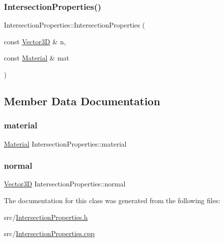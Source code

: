 \subsubsection{\texorpdfstring{IntersectionProperties()}{IntersectionProperties()}\hspace{0.1cm}{\footnotesize\ttfamily [2/2]}}
{\footnotesize\ttfamily Intersection\+Properties\+::\+Intersection\+Properties (\begin{DoxyParamCaption}\item[{const \mbox{\hyperlink{classVector3D}{Vector3D}} \&}]{n,  }\item[{const \mbox{\hyperlink{classMaterial}{Material}} \&}]{mat }\end{DoxyParamCaption})}



\subsection{Member Data Documentation}
\mbox{\label{classIntersectionProperties_a52218ae741a9cd035eeed6cbc40b3300}} 
\subsubsection{\texorpdfstring{material}{material}}
{\footnotesize\ttfamily \mbox{\hyperlink{classMaterial}{Material}} Intersection\+Properties\+::material}

\mbox{\label{classIntersectionProperties_afb99c699b3116580c68936d033b09081}} 
\subsubsection{\texorpdfstring{normal}{normal}}
{\footnotesize\ttfamily \mbox{\hyperlink{classVector3D}{Vector3D}} Intersection\+Properties\+::normal}



The documentation for this class was generated from the following files\+:\begin{DoxyCompactItemize}
\item 
src/\mbox{\hyperlink{IntersectionProperties_8h}{Intersection\+Properties.\+h}}\item 
src/\mbox{\hyperlink{IntersectionProperties_8cpp}{Intersection\+Properties.\+cpp}}\end{DoxyCompactItemize}
